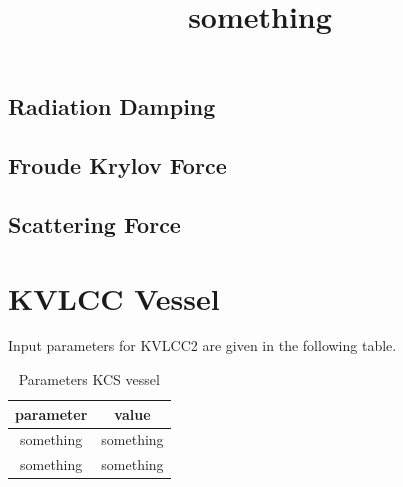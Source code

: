 \subsection{Radiation Damping}
\subsection{Froude Krylov Force}
\subsection{Scattering Force}

\section{KVLCC Vessel}
Input parameters for KVLCC2 are given in the following table.
\begin{table}[H]
    \centering
    \begin{tabular}{|c|c|}
        \hline
        parameter & value \\ 
        \hline
        \title{something}
        something & something \\
        something & something \\
        \hline
    \end{tabular}
    \caption{Parameters KCS vessel}
    \label{tab:kvlcc2_inp}
\end{table}